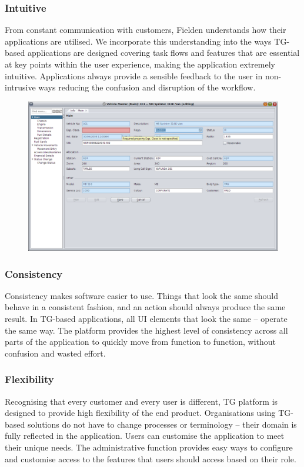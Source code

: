 \documentclass[a4paper,12pt,twocolumn,oneside,openright,final]{memoir}
\begin{document}
\subsubsection*{Intuitive}
  From constant communication with customers, Fielden understands how their applications are utilised. 
  We incorporate this understanding into the ways TG-based applications are designed covering task flows and features that are essential at key points within the user experience, making the application extremely intuitive.
  Applications always provide a sensible feedback to the user in non-intrusive ways reducing the confusion and disruption of the workflow.
  \begin{figure}[!h]
  \centering
  \includegraphics[scale=0.17]{images/04-veh-master-main-error.png}
  \end{figure}

\subsubsection*{Consistency}

  Consistency makes software easier to use. 
  Things that look the same should behave in a consistent fashion, and an action should always produce the same result. 
  In TG-based applications, all UI elements that look the same -- operate the same way. 
  The platform provides the highest level of consistency across all parts of the application to quickly move from function to function, without confusion and wasted effort.
 
\subsubsection*{Flexibility}
  Recognising that every customer and every user is different, TG platform is designed to provide high flexibility of the end product. 
  Organisations using TG-based solutions do not have to change processes or terminology -- their domain is fully reflected in the application. 
  Users can customise the application to meet their unique needs.
  The administrative function provides easy ways to configure and customise access to the features that users should access based on their role.
\end{document}
